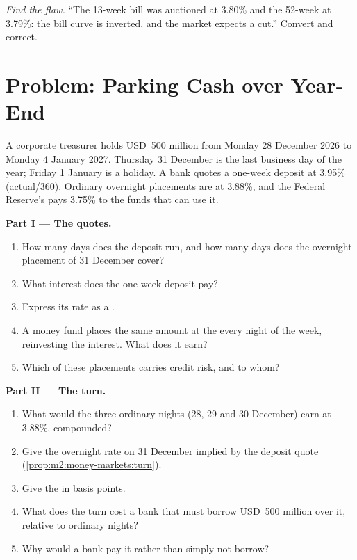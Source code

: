 \begin{exercise}[$\star\star\star$]\label{exo:m2:money-markets:8}
\emph{Find the flaw.} ``The 13-week bill was auctioned at 3.80\% and the
52-week at 3.79\%: the bill curve is inverted, and the market expects a
cut.'' Convert and correct.
\end{exercise}

\section{Problem: Parking Cash over Year-End}

\begin{problem}\label{pb:m2:money-markets:1}
A corporate treasurer holds USD~500 million from Monday 28 December 2026 to
Monday 4 January 2027. Thursday 31 December is the last business day of the
year; Friday 1 January is a holiday. A bank quotes a one-week deposit at
3.95\% (actual/360). Ordinary overnight placements are at 3.88\%, and the
Federal Reserve's  pays 3.75\% to the funds that can
use it.

\medskip\noindent\textbf{Part I --- The quotes.}
\begin{enumerate}
\item How many days does the deposit run, and how many days does the overnight
placement of 31 December cover?
\item What interest does the one-week deposit pay?
\item Express its rate as a .
\item A money fund places the same amount at the  every
night of the week, reinvesting the interest. What does it earn?
\item Which of these placements carries credit risk, and to whom?
\end{enumerate}

\medskip\noindent\textbf{Part II --- The turn.}
\begin{enumerate}[resume]
\item What would the three ordinary nights (28, 29 and 30 December) earn at
3.88\%, compounded?
\item Give the overnight rate on 31 December implied by the deposit quote
(\cref{prop:m2:money-markets:turn}).
\item Give the  in basis points.
\item What does the turn cost a bank that must borrow USD~500 million over it,
relative to ordinary nights?
\item Why would a bank pay it rather than simply not borrow?
\end{enumerate}


\end{problem}
